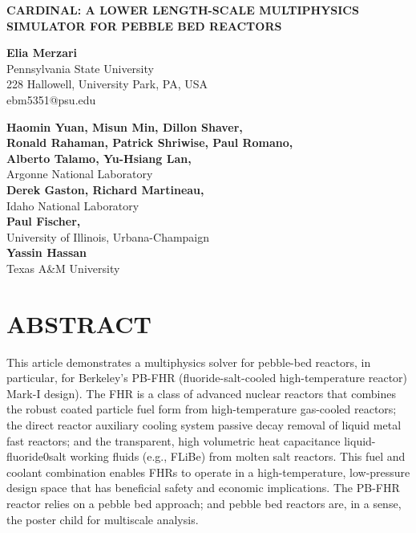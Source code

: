 \documentclass[11pt,letterpaper,english]{article}
\begin{document}
\vspace*{-0.45in}
\begin{center}
{\Large\centering\bf CARDINAL: A LOWER LENGTH-SCALE MULTIPHYSICS SIMULATOR FOR PEBBLE BED REACTORS}

\vspace{3pt}

{\bf \large Elia Merzari} \\
\large Pennsylvania State University \\
\large 228 Hallowell, University Park, PA, USA \\
{\color{brown} ebm5351@psu.edu} \\

\vspace{0.25in}

{\bf \large Haomin Yuan, Misun Min, Dillon Shaver,} \\
{\bf \large Ronald Rahaman, Patrick Shriwise, Paul Romano, } \\
{\bf \large Alberto Talamo, Yu-Hsiang Lan, } \\
\large Argonne National Laboratory \\
\vspace{0.25in}
{\bf \large Derek Gaston, Richard Martineau,} \\
\large Idaho National Laboratory \\
\vspace{0.25in}
{\bf \large Paul Fischer,} \\
\large University of Illinois, Urbana-Champaign\\
\vspace{0.25in}
{\bf \large  Yassin Hassan } \\
\large Texas A\&M University \\

\end{center}



\normalsize

\section*{ABSTRACT}

This article demonstrates a multiphysics solver for pebble-bed reactors, in particular, for Berkeley's PB-FHR (fluoride-salt-cooled high-temperature reactor) Mark-I design). The FHR is a class of advanced nuclear reactors that combines the robust coated particle fuel form from high-temperature gas-cooled reactors; the direct reactor auxiliary cooling system passive decay removal of liquid metal fast reactors; and the transparent, high volumetric heat capacitance liquid-fluoride0salt working fluids (e.g., FLiBe) from molten salt reactors. This fuel and coolant combination enables FHRs to operate in a high-temperature, low-pressure design space that has beneficial safety and economic implications. The PB-FHR reactor relies on a pebble bed approach; and pebble bed reactors are, in a sense, the poster child for multiscale analysis.
\end{document}
